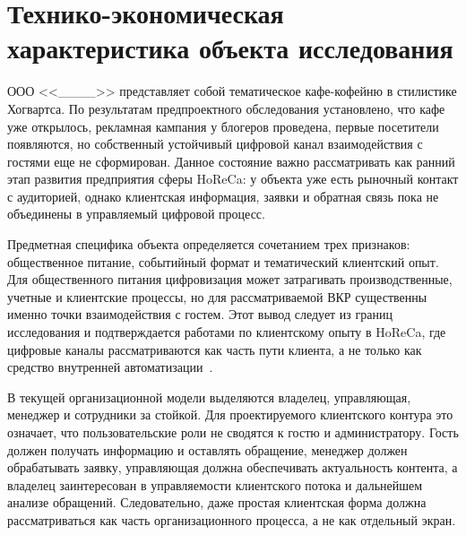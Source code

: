 \section{Технико-экономическая характеристика объекта исследования}

ООО <<\_\_\_\_>> представляет собой тематическое кафе-кофейню в стилистике Хогвартса. По результатам предпроектного обследования установлено, что кафе уже открылось, рекламная кампания у блогеров проведена, первые посетители появляются, но собственный устойчивый цифровой канал взаимодействия с гостями еще не сформирован. Данное состояние важно рассматривать как ранний этап развития предприятия сферы HoReCa: у объекта уже есть рыночный контакт с аудиторией, однако клиентская информация, заявки и обратная связь пока не объединены в управляемый цифровой процесс.

Предметная специфика объекта определяется сочетанием трех признаков: общественное питание, событийный формат и тематический клиентский опыт. Для общественного питания цифровизация может затрагивать производственные, учетные и клиентские процессы, но для рассматриваемой ВКР существенны именно точки взаимодействия с гостем. Этот вывод следует из границ исследования и подтверждается работами по клиентскому опыту в HoReCa, где цифровые каналы рассматриваются как часть пути клиента, а не только как средство внутренней автоматизации~\cite{klientskiy_opyt_horeca,batsyna2020,pantouvakis2022}.

В текущей организационной модели выделяются владелец, управляющая, менеджер и сотрудники за стойкой. Для проектируемого клиентского контура это означает, что пользовательские роли не сводятся к гостю и администратору. Гость должен получать информацию и оставлять обращение, менеджер должен обрабатывать заявку, управляющая должна обеспечивать актуальность контента, а владелец заинтересован в управляемости клиентского потока и дальнейшем анализе обращений. Следовательно, даже простая клиентская форма должна рассматриваться как часть организационного процесса, а не как отдельный экран.

